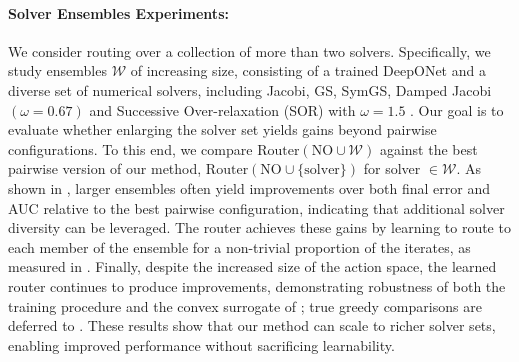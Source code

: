 \documentclass{article}
\begin{document}
\paragraph{Solver Ensembles Experiments:} We consider routing over a collection of more than two solvers. Specifically, we study 
ensembles $\mathcal{W}$ of increasing size, consisting of a trained DeepONet and a diverse set of numerical solvers, including Jacobi, GS, SymGS, Damped Jacobi $(\omega = 0.67)$ and Successive Over-relaxation (SOR) with $\omega = 1.5$ . Our goal is to evaluate whether enlarging the solver set yields gains beyond pairwise configurations. To this end, we compare $\mathrm{Router}(\mathrm{NO}\cup\mathcal{W})$ against the best pairwise version of our method, $\mathrm{Router}(\mathrm{NO}\cup\{\text{solver}\})$ for solver $\in \mathcal{W}$. As shown in , larger ensembles often yield improvements over both final error and AUC relative to the best pairwise configuration, indicating that additional solver diversity can be leveraged. The router achieves these gains by learning to route to each member of the ensemble for a non-trivial proportion of the iterates, as measured in . Finally, despite the increased size of the action space, the learned router continues to produce improvements, demonstrating robustness of both the training procedure and the convex surrogate of ; true greedy comparisons are deferred to . These results show that our method can scale to richer solver sets, enabling improved performance without sacrificing learnability.
\end{document}
